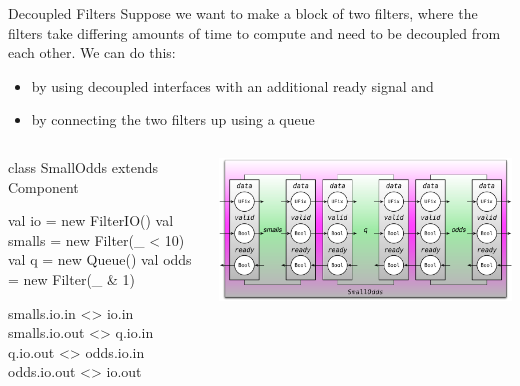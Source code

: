 \documentclass[xcolor=pdflatex,dvipsnames,table]{beamer}
\begin{document}
\begin{frame}[fragile]{Decoupled Filters}
Suppose we want to make a block of two filters, where the filters take differing amounts of time to compute and need to be decoupled from each other.
We can do this:
\begin{itemize}
\item by using decoupled interfaces with an additional ready signal and
\item by connecting the two filters up using a queue
\end{itemize}

\begin{columns}

{
\begin{scala}
class SmallOdds extends Component { 
  val io     = new FilterIO()
  val smalls = new Filter(_ < 10)
  val q      = new Queue()
  val odds   = new Filter(_ & 1)

  smalls.io.in  <> io.in
  smalls.io.out <> q.io.in
  q.io.out      <> odds.io.in
  odds.io.out   <> io.out
}
\end{scala}
}


\begin{center}
\includegraphics[width=1.0\textwidth]{figs/decoupled-block.pdf} 
\end{center}

\end{columns}

\end{frame}
\end{document}
